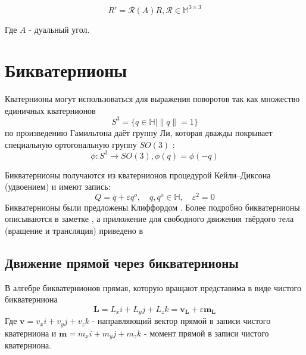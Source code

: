   \begin{equation*}
    R' = \mathcal{R}(A) R, \mathcal{R} \in \mathbb{M}^{3 \times 3}
  \end{equation*}

  Где $A$ - дуальный угол. 

  \section{Бикватернионы}

  Кватернионы могут использоваться для выражения поворотов \autocite[Гл. N]{chelnokov2006кватернионные} так как множество единичных кватернионов 
  \begin{equation*}
    S^3 = \{q \in \mathbb{H} \mid \|q\| =1\}
  \end{equation*}
  по произведению Гамильтона даёт группу Ли, которая дважды покрывает специальную ортогональную группу $SO(3)$ \autocite[Гл. 12]{altmann1986rotations}:
  \begin{equation*}
    \phi : S^3 \rightarrow SO(3), \phi(q) = \phi(-q)
  \end{equation*}

  Бикватернионы получаются из кватернионов процедурой Кейли--Диксона (удвоением) и имеют запись:
  \begin{equation*}
    Q = q + \varepsilon q^o, \quad q,q^o \in \mathbb{H}, \quad \varepsilon^2=0
  \end{equation*}
  Бикватернионы были предложены Клиффордом \autocite{cliffordPreliminarySketchBiquaternions1871}. Более подробно бикватернионы описываются в заметке \autocite{jiaDualQuaternions2018},
  а приложение для свободного движения твёрдого тела (вращение и трансляция) приведено в \autocite[Гл. N]{chelnokov2006кватернионные}

  \subsection{Движение прямой через бикватернионы}

  В алгебре бикватернионов прямая, которую вращают представима в виде чистого бикватерниона
  \begin{equation*}
    \mathbf{L} = L_x i + L_y j + L_z k = \mathbf{v}_\mathbf{L} + \varepsilon \mathbf{m}_\mathbf{L}
  \end{equation*}
  Где $\mathbf{v} = v_x i + v_y j + v_z k$ - направляющий вектор прямой в записи чистого кватерниона и $\mathbf{m} = m_x i + m_y j + m_z k$ - момент прямой в записи чистого кватерниона.
  
